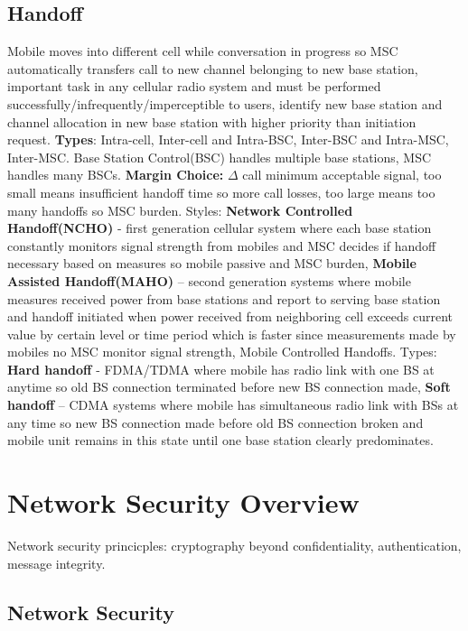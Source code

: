 \documentclass[9pt]{extarticle}
\begin{document}
\begin{multicols}{2}
\subsection{Handoff}

Mobile moves into different cell while conversation in progress so MSC automatically transfers call to new channel belonging to new base station, important task in any cellular radio system and must be performed successfully/infrequently/imperceptible to users, identify new base station and channel allocation in new base station with higher priority than initiation request. \textbf{Types}: Intra-cell, Inter-cell and Intra-BSC, Inter-BSC and Intra-MSC, Inter-MSC. Base Station Control(BSC) handles multiple base stations, MSC handles many BSCs.  \textbf{Margin Choice:} $\Delta$ call minimum acceptable signal, too small means insufficient handoff time so more call losses, too large means too many handoffs so MSC burden. Styles: \textbf{Network Controlled Handoff(NCHO)} - first generation cellular system where each base station constantly monitors signal strength from mobiles and MSC decides if handoff necessary based on measures so mobile passive and MSC burden,\textbf{ Mobile Assisted Handoff(MAHO)} – second generation systems where mobile measures received power from  base stations and report to serving base station and handoff initiated when power received from neighboring cell exceeds current value by certain level or time period which is faster since measurements made by mobiles no MSC monitor signal strength, Mobile Controlled Handoffs. Types: \textbf{Hard handoff} - FDMA/TDMA where mobile has radio link with one BS at anytime so old BS connection terminated before new BS connection made, \textbf{Soft handoff} – CDMA systems where mobile has simultaneous radio link with BSs at any time so new BS connection made before old BS connection broken and mobile unit remains in this state until one base station clearly predominates.

\section{Network Security Overview}

Network security princicples: cryptography beyond confidentiality, authentication, message integrity.

\subsection{Network Security}


\end{multicols}
\end{document}
